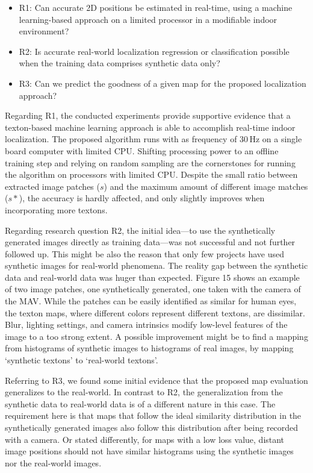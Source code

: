 \begin{itemize}
\item R1: Can accurate 2D positions be estimated in real-time, using a
  machine learning-based approach on a limited processor in a
  modifiable indoor environment?
\item R2: Is accurate real-world localization regression or classification
  possible when the training data comprises synthetic data only?
\item R3: Can we predict the goodness of a given map for the proposed
  localization approach?
\end{itemize}

Regarding R1, the conducted experiments provide supportive evidence
that a texton-based machine learning approach is able to accomplish
real-time indoor localization. The proposed algorithm runs with as
frequency of 30\,Hz on a single board computer with limited
CPU. Shifting processing power to an offline training step and relying
on random sampling are the cornerstones for running the algorithm on
processors with limited CPU. Despite the small ratio between extracted
image patches ($s$) and the maximum amount of different image matches
($s*$), the accuracy is hardly affected, and only slightly improves
when incorporating more textons.

Regarding research question R2, the initial idea—to use the synthetically generated images directly as training data—was not successful and not further followed up. This might be also the reason that only few projects have used synthetic images for real-world phenomena. The reality gap between the synthetic data and real-world data was huger than expected. Figure 15 shows an example of two image patches, one synthetically generated, one taken with the camera of the MAV. While the patches can be easily identified as similar for human eyes, the texton maps, where different colors represent different textons, are dissimilar. Blur, lighting settings, and camera intrinsics modify low-level features of the image to a too strong extent. A possible improvement might be to find a mapping from histograms of synthetic images to histograms of real images, by mapping ‘synthetic textons’ to ‘real-world textons’.

Referring to R3, we found some initial evidence that the proposed map evaluation generalizes to the real-world. In contrast to R2, the generalization from the synthetic data to real-world data is of a different nature in this case. The requirement here is that maps that follow the ideal similarity distribution in the synthetically generated images also follow this distribution after being recorded with a camera. Or stated differently, for maps with a low loss value, distant image positions should not have similar histograms using the synthetic images nor the real-world images.  

